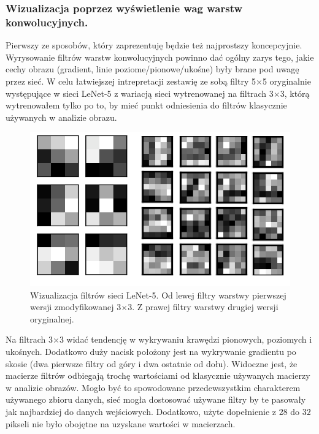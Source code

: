 \subsubsection{Wizualizacja poprzez wyświetlenie wag warstw konwolucyjnych.}
Pierwszy ze sposobów, który zaprezentuję będzie też najprostszy koncepcyjnie. Wyrysowanie filtrów warstw konwolucyjnych powinno dać ogólny zarys tego, jakie cechy obrazu (gradient, linie poziome/pionowe/ukośne) były brane pod uwagę przez sieć. W celu łatwiejszej intrepretacji zestawię ze sobą filtry 5\(\times\)5 oryginalnie występujące w sieci LeNet-5 z wariacją sieci wytrenowanej na filtrach 3\(\times\)3, którą wytrenowałem tylko po to, by mieć punkt odniesienia do filtrów
klasycznie używanych w analizie obrazu.

\begin{figure}[ht]
\centerline{\includegraphics[scale=0.5]{resources/plot_filtry.png}}
\caption{Wizualizacja filtrów sieci LeNet-5. Od lewej filtry warstwy pierwszej wersji zmodyfikowanej 3\(\times\)3. Z prawej filtry warstwy drugiej wersji oryginalnej.}
\label{fig:lenet5-response}
\end{figure}

Na filtrach 3\(\times\)3 widać tendencję w wykrywaniu krawędzi pionowych, poziomych i ukośnych. Dodatkowo duży nacisk położony jest na wykrywanie gradientu po skosie (dwa pierwsze filtry od góry i dwa ostatnie od dołu).
Widoczne jest, że macierze filtrów odbiegają trochę wartościami od klasycznie używanych macierzy w analizie obrazów. Mogło być to spowodowane przedewszystkim charakterem używanego zbioru danych, sieć mogła dostosować używane filtry by te pasowały jak najbardziej do danych wejściowych. Dodatkowo, użyte dopełnienie z \(28\) do \(32\) pikseli nie było obojętne na uzyskane wartości w macierzach.

